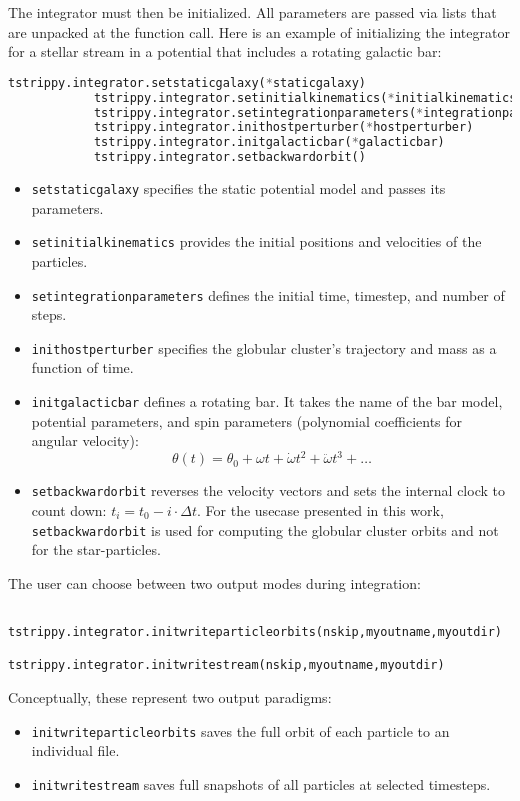 \documentclass{article}
\begin{document}
        The integrator must then be initialized. All parameters are passed via lists that are unpacked at the function call. Here is an example of initializing the integrator for a stellar stream in a potential that includes a rotating galactic bar:
        \small
        \begin{lstlisting}[language=python]
            tstrippy.integrator.setstaticgalaxy(*staticgalaxy)
            tstrippy.integrator.setinitialkinematics(*initialkinematics)
            tstrippy.integrator.setintegrationparameters(*integrationparameters)
            tstrippy.integrator.inithostperturber(*hostperturber)
            tstrippy.integrator.initgalacticbar(*galacticbar)
            tstrippy.integrator.setbackwardorbit()
        \end{lstlisting}
        \normalsize

        \begin{itemize}
            \item \texttt{setstaticgalaxy} specifies the static potential model and passes its parameters.
            \item \texttt{setinitialkinematics} provides the initial positions and velocities of the particles.
            \item \texttt{setintegrationparameters} defines the initial time, timestep, and number of steps.
            \item \texttt{inithostperturber} specifies the globular cluster’s trajectory and mass as a function of time.
            \item \texttt{initgalacticbar} defines a rotating bar. It takes the name of the bar model, potential parameters, and spin parameters (polynomial coefficients for angular velocity):  
            \[
            \theta(t) = \theta_0 + \omega t + \dot{\omega} t^2 + \ddot{\omega} t^3 + \dots
            \]
            \item \texttt{setbackwardorbit} reverses the velocity vectors and sets the internal clock to count down: $t_i = t_0 - i \cdot \Delta t$. For the usecase presented in this work, \texttt{setbackwardorbit} is used for computing the globular cluster orbits and not for the star-particles. 
        \end{itemize}

        The user can choose between two output modes during integration:
        \begin{lstlisting}
            tstrippy.integrator.initwriteparticleorbits(nskip,myoutname,myoutdir)
            tstrippy.integrator.initwritestream(nskip,myoutname,myoutdir)
        \end{lstlisting}
        Conceptually, these represent two output paradigms:
        \begin{itemize}
            \item \texttt{initwriteparticleorbits} saves the full orbit of each particle to an individual file.
            \item \texttt{initwritestream} saves full snapshots of all particles at selected timesteps.
        \end{itemize}
\end{document}
